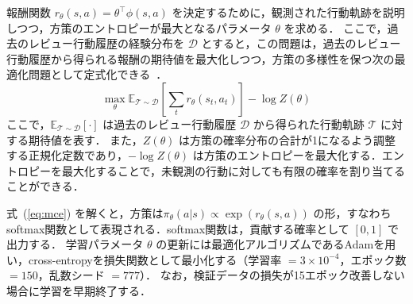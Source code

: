 \documentclass[submit]{ipsj}
\begin{document}
報酬関数 $r_\theta(s,a) = \theta^\top \phi(s,a)$ を決定するために，観測された行動軌跡を説明しつつ，方策のエントロピーが最大となるパラメータ $\theta$ を求める．
ここで，過去のレビュー行動履歴の経験分布を $\mathcal{D}$ とすると，この問題は，過去のレビュー行動履歴から得られる報酬の期待値を最大化しつつ，方策の多様性を保つ次の最適化問題として定式化できる~\cite{ziebart}．
\begin{equation}
\max_\theta \mathbb{E}_{\mathcal{T} \sim \mathcal{D}}
\left[\sum_t r_\theta(s_t, a_t)\right] - \log Z(\theta)
\label{eq:mce}
\end{equation}
ここで，$\mathbb{E}_{\mathcal{T} \sim \mathcal{D}}[\cdot]$ は過去のレビュー行動履歴 $\mathcal{D}$ から得られた行動軌跡 $\mathcal{T}$ に対する期待値を表す．
また，$Z(\theta)$ は方策の確率分布の合計が1になるよう調整する正規化定数であり，$-\log Z(\theta)$ は方策のエントロピーを最大化する．エントロピーを最大化することで，未観測の行動に対しても有限の確率を割り当てることができる．

式~(\ref{eq:mce}) を解くと，方策は$\pi_\theta(a|s) \propto \exp(r_\theta(s,a))$ の形，すなわちsoftmax関数として表現される．softmax関数は，貢献する確率として $[0, 1]$ で出力する．
学習パラメータ $\theta$ の更新には最適化アルゴリズムであるAdam\cite{adam}を用い，cross-entropyを損失関数として最小化する（学習率 $= 3\times10^{-4}$，エポック数 $= 150$，乱数シード $= 777$）．
なお，検証データの損失が15エポック改善しない場合に学習を早期終了する．







\end{document}
